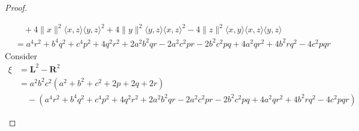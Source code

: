 \documentclass[a4paper,10pt]{article}
\theoremstyle{plain}
\theoremstyle{definition}
\theoremstyle{remark}
\begin{document}
\begin{proof}
\begin{itemize}
\begin{align*}
&\quad + 4 \lVert x \rVert^2  \langle x , z \rangle \langle y , z \rangle ^2 + 4 \lVert y \rVert^2 \langle y , z \rangle \langle x , z \rangle ^2 - 4 \lVert z \rVert^2 \langle x , y \rangle \langle x , z \rangle  \langle y , z \rangle  \\
&=  a^4 r^2 + b^4 q^2 + c^4 p^2 + 4q^2 r^2 + 2a^2 b^2 qr - 2a^2 c^2 pr - 2b^2 c^2 pq + 4a^2 q r^2 + 4b^2 r q^2 - 4c^2 pqr
\end{align*}
Consider 
\begin{align*}
\xi &= \textbf{L}^2 - \textbf{R}^2 \\
&= a^2 b^2 c^2 (a^2 + b^2 + c^2 + 2p + 2q + 2r) \\
&\quad - \left( a^4 r^2 + b^4 q^2 + c^4 p^2 + 4q^2 r^2 + 2a^2 b^2 qr - 2a^2 c^2 pr - 2b^2 c^2 pq + 4a^2 q r^2 + 4b^2 r q^2 - 4c^2 pqr \right)
\end{align*}


\end{itemize}
\end{proof}
\end{document}
